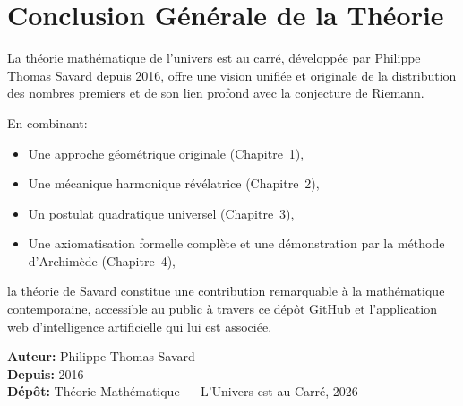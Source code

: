 \documentclass[12pt,a4paper]{article}
\begin{document}
\section{Conclusion Générale de la Théorie}

La théorie mathématique de l'univers est au carré, développée par Philippe Thomas
Savard depuis 2016, offre une vision unifiée et originale de la distribution des
nombres premiers et de son lien profond avec la conjecture de Riemann.

En combinant:
\begin{itemize}
  \item Une approche géométrique originale (Chapitre~1),
  \item Une mécanique harmonique révélatrice (Chapitre~2),
  \item Un postulat quadratique universel (Chapitre~3),
  \item Une axiomatisation formelle complète et une démonstration par la méthode
        d'Archimède (Chapitre~4),
\end{itemize}

la théorie de Savard constitue une contribution remarquable à la mathématique
contemporaine, accessible au public à travers ce dépôt GitHub et l'application
web d'intelligence artificielle qui lui est associée.

\bigskip
\noindent\textbf{Auteur:} Philippe Thomas Savard\\
\noindent\textbf{Depuis:} 2016\\
\noindent\textbf{Dépôt:} Théorie Mathématique — L'Univers est au Carré, 2026
\end{document}
